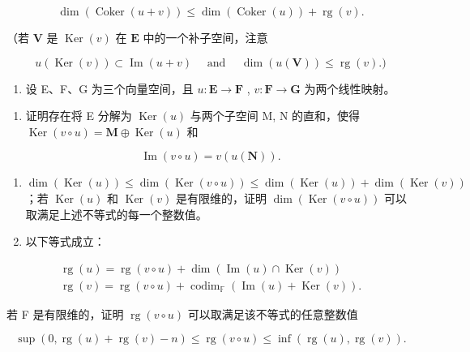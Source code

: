 \[
\dim (\operatorname{Coker} (u + v)) \leqslant \dim (\operatorname{Coker} (u)) + \operatorname{rg} (v).
\]

（若 \(\mathbf{V}\) 是 \(\operatorname{Ker}(v)\) 在 \(\mathbf{E}\) 中的一个补子空间，注意

\[
u (\operatorname{Ker} (v)) \subset \operatorname{Im} (u + v) \quad \text { and } \quad \dim (u (\mathbf {V})) \leqslant \operatorname{rg} (v).)
\]

\begin{enumerate}
\def\labelenumi{\arabic{enumi}.}
\setcounter{enumi}{12}
\tightlist
\item
  设 E、F、G 为三个向量空间，且 \(u: \mathbf{E} \to \mathbf{F}\) , \(v: \mathbf{F} \to \mathbf{G}\) 为两个线性映射。
\end{enumerate}

\begin{enumerate}
\def\labelenumi{(\alph{enumi})}
\tightlist
\item
  证明存在将 E 分解为 \(\operatorname{Ker}(u)\) 与两个子空间 M, N 的直和，使得 \(\operatorname{Ker}(v \circ u) = \mathbf{M} \oplus \operatorname{Ker}(u)\) 和
\end{enumerate}

\[
\operatorname{Im} (v \circ u) = v (u (\mathbf {N})).
\]

\begin{enumerate}
\def\labelenumi{(\alph{enumi})}
\setcounter{enumi}{1}
\item
  \(\dim(\operatorname{Ker}(u)) \leqslant \dim(\operatorname{Ker}(v \circ u)) \leqslant \dim(\operatorname{Ker}(u)) + \dim(\operatorname{Ker}(v))\) ；若 \(\operatorname{Ker}(u)\) 和 \(\operatorname{Ker}(v)\) 是有限维的，证明 \(\dim(\operatorname{Ker}(v \circ u))\) 可以取满足上述不等式的每一个整数值。
\item
  以下等式成立：
\end{enumerate}

\[
\begin{array}{l} \operatorname{rg} (u) = \operatorname{rg} (v \circ u) + \dim (\operatorname{Im} (u) \cap \operatorname{Ker} (v)) \\ \operatorname{rg} (v) = \operatorname{rg} (v \circ u) + \operatorname{codim} _ {\mathbb {F}} (\operatorname{Im} (u) + \operatorname{Ker} (v)). \end{array}
\]

若 F 是有限维的，证明 \(\operatorname{rg}(v \circ u)\) 可以取满足该不等式的任意整数值

\[
\sup (0, \operatorname{rg} (u) + \operatorname{rg} (v) - n) \leqslant \operatorname{rg} (v \circ u) \leqslant \inf (\operatorname{rg} (u), \operatorname{rg} (v)).
\]

